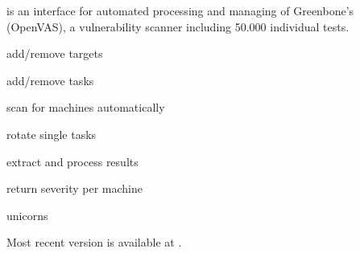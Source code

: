 
\sw is an interface for automated processing and managing of Greenbone's  (OpenVAS), a vulnerability scanner including 50.000 individual tests.

\begin{checklist} 
  \item[\checked] add/remove targets
  \item[\checked] add/remove tasks
  \item[\checked] scan for machines automatically
  \item[\checked] rotate single tasks
  \item[\checked] extract and process results
  \item[\checked] return severity per machine
  \item[\crossed] unicorns
\end{checklist}
 
Most recent version is available at .
